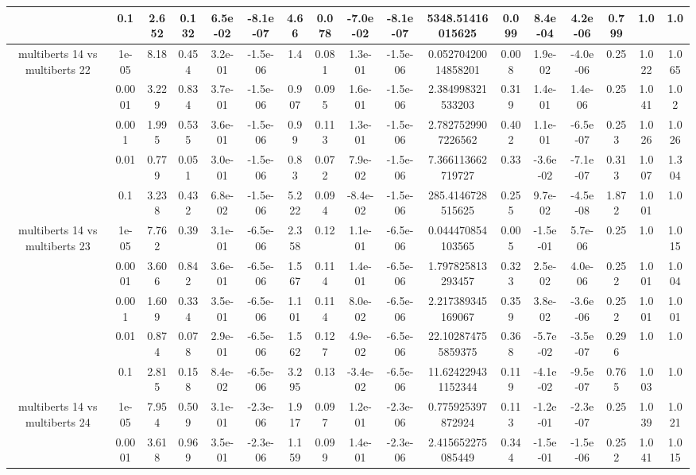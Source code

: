 \begin{tabular}{|c|c|c|c|c|c|c|c|c|c|c|c|c|c|c|c|c|}
 & 0.1 & 2.652 & 0.132 & 6.5e-02 & -8.1e-07 & 4.66 & 0.078 & -7.0e-02 & -8.1e-07 & 5348.51416015625 & 0.099 & 8.4e-04 & 4.2e-06 & 0.799 & 1.0 & 1.0 \\
\hline
\multirow{5}{*}{multiberts 14 vs multiberts 22} & 1e-05 & 8.18 & 0.454 & 3.2e-01 & -1.5e-06 & 1.4 & 0.081 & 1.3e-01 & -1.5e-06 & 0.05270420014858201 & 0.008 & 1.9e-02 & -4.0e-06 & 0.25 & 1.022 & 1.065 \\
 & 0.0001 & 3.229 & 0.834 & 3.7e-01 & -1.5e-06 & 0.907 & 0.095 & 1.6e-01 & -1.5e-06 & 2.384998321533203 & 0.319 & 1.4e-01 & 1.4e-06 & 0.25 & 1.041 & 1.02 \\
 & 0.001 & 1.995 & 0.535 & 3.6e-01 & -1.5e-06 & 0.99 & 0.113 & 1.3e-01 & -1.5e-06 & 2.7827529907226562 & 0.402 & 1.1e-01 & -6.5e-07 & 0.253 & 1.026 & 1.026 \\
 & 0.01 & 0.779 & 0.051 & 3.0e-01 & -1.5e-06 & 0.83 & 0.072 & 7.9e-02 & -1.5e-06 & 7.366113662719727 & 0.33 & -3.6e-02 & -7.1e-07 & 0.313 & 1.007 & 1.304 \\
 & 0.1 & 3.238 & 0.432 & 6.8e-02 & -1.5e-06 & 5.222 & 0.094 & -8.4e-02 & -1.5e-06 & 285.4146728515625 & 0.255 & 9.7e-02 & -4.5e-08 & 1.872 & 1.001 & 1.0 \\
\hline
\multirow{5}{*}{multiberts 14 vs multiberts 23} & 1e-05 & 7.762 & 0.39 & 3.1e-01 & -6.5e-06 & 2.358 & 0.12 & 1.1e-01 & -6.5e-06 & 0.044470854103565 & 0.005 & -1.5e-01 & 5.7e-06 & 0.25 & 1.0 & 1.015 \\
 & 0.0001 & 3.606 & 0.842 & 3.6e-01 & -6.5e-06 & 1.567 & 0.114 & 1.4e-01 & -6.5e-06 & 1.797825813293457 & 0.323 & 2.5e-02 & 4.0e-06 & 0.252 & 1.001 & 1.004 \\
 & 0.001 & 1.609 & 0.334 & 3.5e-01 & -6.5e-06 & 1.101 & 0.114 & 8.0e-02 & -6.5e-06 & 2.217389345169067 & 0.359 & 3.8e-02 & -3.6e-06 & 0.252 & 1.001 & 1.001 \\
 & 0.01 & 0.874 & 0.078 & 2.9e-01 & -6.5e-06 & 1.562 & 0.127 & 4.9e-02 & -6.5e-06 & 22.102874755859375 & 0.368 & -5.7e-02 & -3.5e-07 & 0.296 & 1.0 & 1.0 \\
 & 0.1 & 2.815 & 0.158 & 8.4e-02 & -6.5e-06 & 3.295 & 0.13 & -3.4e-02 & -6.5e-06 & 11.624229431152344 & 0.119 & -4.1e-02 & -9.5e-07 & 0.765 & 1.003 & 1.0 \\
\hline
\multirow{5}{*}{multiberts 14 vs multiberts 24} & 1e-05 & 7.954 & 0.509 & 3.1e-01 & -2.3e-06 & 1.917 & 0.097 & 1.2e-01 & -2.3e-06 & 0.775925397872924 & 0.113 & -1.2e-01 & -2.3e-07 & 0.25 & 1.039 & 1.021 \\
 & 0.0001 & 3.618 & 0.969 & 3.5e-01 & -2.3e-06 & 1.159 & 0.099 & 1.4e-01 & -2.3e-06 & 2.415652275085449 & 0.344 & -1.5e-01 & -1.5e-06 & 0.252 & 1.041 & 1.015 \\

\end{tabular}
